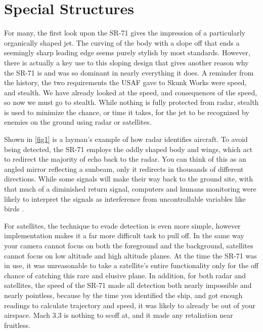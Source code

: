 \documentclass[conf]{new-aiaa}
\begin{document}
\section{Special Structures}
For many, the first look upon the SR-71 gives the impression of a particularly organically shaped jet. The curving of the body with a slope off that ends a seemingly sharp leading edge seems purely stylish by most standards. However, there is actually a key use to this sloping design that gives another reason why the SR-71 is and was so dominant in nearly everything it does. A reminder from the history, the two requirements the USAF gave to Skunk Works were speed, and stealth. We have already looked at the speed, and consequences of the speed, so now we must go to stealth. While nothing is fully protected from radar, stealth is used to minimize the chance, or time it takes, for the jet to be recognized by enemies on the ground using radar or satellites.\par
Shown in \ref{fig1} is a layman's example of how radar identifies aircraft. To avoid being detected, the SR-71 employs the oddly shaped body and wings, which act to redirect the majority of echo back to the radar. You can think of this as an angled mirror reflecting a sunbeam, only it redirects in thousands of different directions. While some signals will make their way back to the ground site, with that much of a diminished return signal, computers and humans monitoring were likely to interpret the signals as interference from uncontrollable variables like birds \cite{airframe}.\par
For satellites, the technique to evade detection is even more simple, however implementation makes it a far more difficult task to pull off. In the same way your camera cannot focus on both the foreground and the background, satellites cannot focus on low altitude and high altitude planes. At the time the SR-71 was in use, it was unreasonable to take a satellite's entire functionality only for the off chance of catching this rare and elusive plane. In addition, for both radar and satellites, the speed of the SR-71 made all detection both nearly impossible and nearly pointless, because by the time you identified the ship, and got enough readings to calculate trajectory and speed, it was likely to already be out of your airspace. Mach 3.3 is nothing to scoff at, and it made any retaliation near fruitless.
\end{document}
